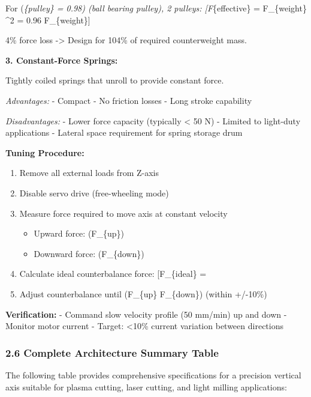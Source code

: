 \documentclass[
]{article}
\providecommand{\tightlist}{%
  \setlength{\itemsep}{0pt}\setlength{\parskip}{0pt}}
\begin{document}
For (\eta\emph{\{pulley\} = 0.98) (ball bearing pulley), 2 pulleys:
{[}F}\{effective\} = F\_\{weight\} \^{}2 = 0.96
F\_\{weight\}{]}

4\% force loss -\textgreater{} Design for 104\% of required
counterweight mass.

\textbf{3. Constant-Force Springs:}

Tightly coiled springs that unroll to provide constant force.

\emph{Advantages:} - Compact - No friction losses - Long stroke
capability

\emph{Disadvantages:} - Lower force capacity (typically \textless{} 50
N) - Limited to light-duty applications - Lateral space requirement for
spring storage drum

\textbf{Tuning Procedure:}

\begin{enumerate}
\def\labelenumi{\arabic{enumi}.}
\tightlist
\item
  Remove all external loads from Z-axis
\item
  Disable servo drive (free-wheeling mode)
\item
  Measure force required to move axis at constant velocity

  \begin{itemize}
  \tightlist
  \item
    Upward force: (F\_\{up\})
  \item
    Downward force: (F\_\{down\})
  \end{itemize}
\item
  Calculate ideal counterbalance force: {[}F\_\{ideal\} =
  \frac{F_{up} - F_{down}}{2}{]}
\item
  Adjust counterbalance until (F\_\{up\} \approx F\_\{down\}) (within
  +/-10\%)
\end{enumerate}

\textbf{Verification:} - Command slow velocity profile (50 mm/min) up
and down - Monitor motor current - Target: \textless10\% current
variation between directions

\subsubsection{2.6 Complete Architecture Summary
Table}\label{complete-architecture-summary-table}

The following table provides comprehensive specifications for a
precision vertical axis suitable for plasma cutting, laser cutting, and
light milling applications:
\end{document}
